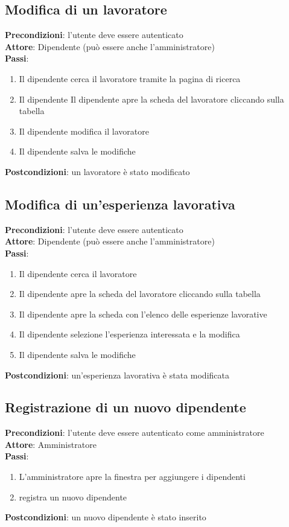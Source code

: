 \documentclass[ 4paper,11pt,openany]{book}
\begin{document}
\subsection{Modifica di un lavoratore}
\textbf{Precondizioni}: l'utente deve essere autenticato\\
\textbf{Attore}: Dipendente (può essere anche l'amministratore)\\
\textbf{Passi}:
\begin{enumerate}
\item Il dipendente cerca il lavoratore tramite la pagina di ricerca
\item Il dipendente Il dipendente apre la scheda del lavoratore cliccando sulla tabella 
\item Il dipendente modifica il lavoratore
\item Il dipendente salva le modifiche
\end{enumerate}
\textbf{Postcondizioni}: un lavoratore è stato modificato\\

\subsection{Modifica di un'esperienza lavorativa}
\textbf{Precondizioni}: l'utente deve essere autenticato\\
\textbf{Attore}: Dipendente (può essere anche l'amministratore)\\
\textbf{Passi}:
\begin{enumerate}
\item Il dipendente cerca il lavoratore
\item Il dipendente apre la scheda del lavoratore cliccando sulla tabella
\item Il dipendente apre la scheda con l'elenco delle esperienze lavorative
\item Il dipendente selezione l'esperienza interessata e la modifica
\item Il dipendente salva le modifiche
\end{enumerate}
\textbf{Postcondizioni}: un'esperienza lavorativa è stata modificata\\

\subsection{Registrazione di un nuovo dipendente}
\textbf{Precondizioni}: l'utente deve essere autenticato come amministratore\\
\textbf{Attore}: Amministratore\\
\textbf{Passi}:
\begin{enumerate}
\item L'amministratore apre la finestra per aggiungere i dipendenti 
\item registra un nuovo dipendente
\end{enumerate}
\textbf{Postcondizioni}: un nuovo dipendente è stato inserito\\
\end{document}
